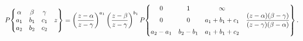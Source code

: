 \[\mathop{P\/}\nolimits\!\begin{Bmatrix}\alpha&\beta&\gamma&\\
a_{1}&b_{1}&c_{1}&z\\
a_{2}&b_{2}&c_{2}&\end{Bmatrix}=\left(\frac{z-\alpha}{z-\gamma}\right)^{a_{1}}%
\left(\frac{z-\beta}{z-\gamma}\right)^{b_{1}}\mathop{P\/}\nolimits\!\begin{%
Bmatrix}0&1&\infty&\\
0&0&a_{1}+b_{1}+c_{1}&\dfrac{(z-\alpha)(\beta-\gamma)}{(z-\gamma)(\beta-\alpha%
)}\\
a_{2}-a_{1}&b_{2}-b_{1}&a_{1}+b_{1}+c_{2}&\end{Bmatrix}.\]